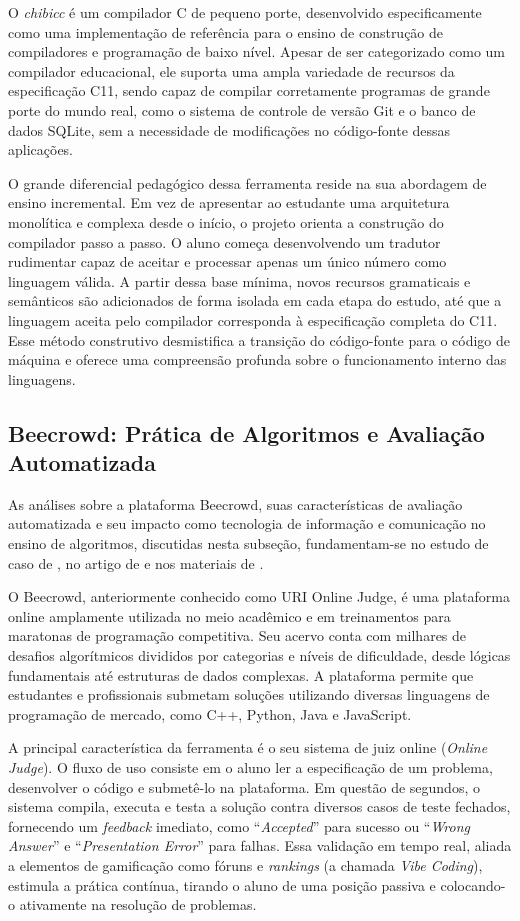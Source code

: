 O \textit{chibicc} é um compilador C de pequeno porte, desenvolvido especificamente como uma implementação de referência para o ensino de construção de compiladores e programação de baixo nível. Apesar de ser categorizado como um compilador educacional, ele suporta uma ampla variedade de recursos da especificação C11, sendo capaz de compilar corretamente programas de grande porte do mundo real, como o sistema de controle de versão Git e o banco de dados SQLite, sem a necessidade de modificações no código-fonte dessas aplicações.

O grande diferencial pedagógico dessa ferramenta reside na sua abordagem de ensino incremental. Em vez de apresentar ao estudante uma arquitetura monolítica e complexa desde o início, o projeto orienta a construção do compilador passo a passo. O aluno começa desenvolvendo um tradutor rudimentar capaz de aceitar e processar apenas um único número como linguagem válida. A partir dessa base mínima, novos recursos gramaticais e semânticos são adicionados de forma isolada em cada etapa do estudo, até que a linguagem aceita pelo compilador corresponda à especificação completa do C11. Esse método construtivo desmistifica a transição do código-fonte para o código de máquina e oferece uma compreensão profunda sobre o funcionamento interno das linguagens.

\subsection{Beecrowd: Prática de Algoritmos e Avaliação Automatizada}

As análises sobre a plataforma Beecrowd, suas características de avaliação automatizada e seu impacto como tecnologia de informação e comunicação no ensino de algoritmos, discutidas nesta subseção, fundamentam-se no estudo de caso de , no artigo de  e nos materiais de .

O Beecrowd, anteriormente conhecido como URI Online Judge, é uma plataforma online amplamente utilizada no meio acadêmico e em treinamentos para maratonas de programação competitiva. Seu acervo conta com milhares de desafios algorítmicos divididos por categorias e níveis de dificuldade, desde lógicas fundamentais até estruturas de dados complexas. A plataforma permite que estudantes e profissionais submetam soluções utilizando diversas linguagens de programação de mercado, como C++, Python, Java e JavaScript.

A principal característica da ferramenta é o seu sistema de juiz online (\textit{Online Judge}). O fluxo de uso consiste em o aluno ler a especificação de um problema, desenvolver o código e submetê-lo na plataforma. Em questão de segundos, o sistema compila, executa e testa a solução contra diversos casos de teste fechados, fornecendo um \textit{feedback} imediato, como ``\textit{Accepted}'' para sucesso ou ``\textit{Wrong Answer}'' e ``\textit{Presentation Error}'' para falhas. Essa validação em tempo real, aliada a elementos de gamificação como fóruns e \textit{rankings} (a chamada \textit{Vibe Coding}), estimula a prática contínua, tirando o aluno de uma posição passiva e colocando-o ativamente na resolução de problemas.


